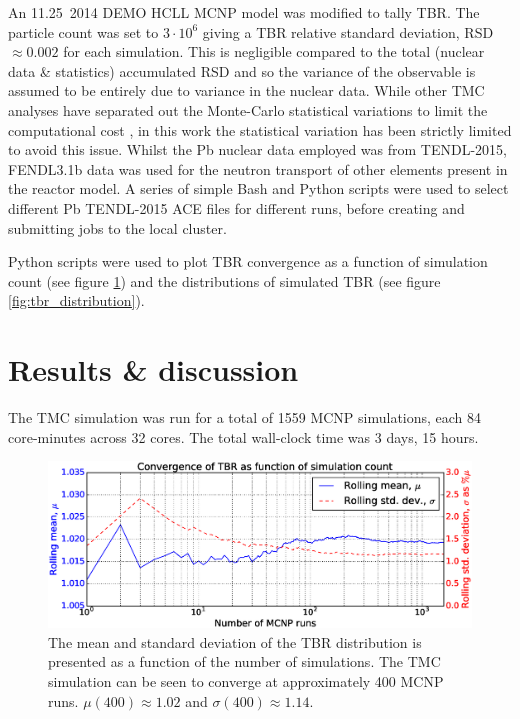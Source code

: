 An 11.25\degree \ 2014 DEMO HCLL MCNP model was modified to tally TBR. The particle count was set to $3\cdot10^{6}$ giving a TBR relative standard deviation, RSD $\approx 0.002$ for each simulation. This is negligible compared to the total (nuclear data \& statistics) accumulated RSD and so the variance of the observable is assumed to be entirely due to variance in the nuclear data. While other TMC analyses have separated out the Monte-Carlo statistical variations to limit the computational cost \cite{Rochman2014a}, in this work the statistical variation has been strictly limited to avoid this issue. Whilst the Pb nuclear data employed was from TENDL-2015, FENDL3.1b data was used for the neutron transport of other elements present in the reactor model. A series of simple Bash and Python scripts were used to select different Pb TENDL-2015 ACE files for different runs, before creating and submitting jobs to the local cluster.

Python scripts were used to plot TBR convergence as a function of simulation count (see figure \ref{fig:convergence}) and the distributions of simulated TBR (see figure \ref{fig:tbr_distribution}).

\section{Results \& discussion}

The TMC simulation was run for a total of 1559 MCNP simulations, each 84 core-minutes across 32 cores. The total wall-clock time was 3 days, 15 hours.

\begin{figure}[ht]
	\includegraphics[width=\textwidth]{hcll_convergence_1559}
	\caption{The mean and standard deviation of the TBR distribution is presented as a function of the number of simulations. The TMC simulation can be seen to converge at approximately 400 MCNP runs. $\mu(400) \approx 1.02$ and $\sigma(400) \approx 1.14$.}
	\label{fig:convergence}
\end{figure}

